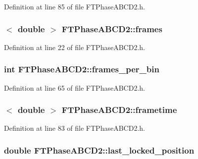 Definition at line 85 of file FTPhaseABCD2.h.

\hypertarget{classFTPhaseABCD2_ac1284b3c87b8a3fcb28fb7aa25021e31}{
\subsubsection[{frames}]{$<$ double $>$ {\bf FTPhaseABCD2::frames}}}
\label{classFTPhaseABCD2_ac1284b3c87b8a3fcb28fb7aa25021e31}


Definition at line 22 of file FTPhaseABCD2.h.

\hypertarget{classFTPhaseABCD2_a819bc8d77a0005500876c87b9b08dab3}{
\subsubsection[{frames\_\-per\_\-bin}]{\setlength{\rightskip}{0pt plus 5cm}int {\bf FTPhaseABCD2::frames\_\-per\_\-bin}}}
\label{classFTPhaseABCD2_a819bc8d77a0005500876c87b9b08dab3}


Definition at line 65 of file FTPhaseABCD2.h.

\hypertarget{classFTPhaseABCD2_a8a835c4c65a6bc45a0032aeced937be6}{
\subsubsection[{frametime}]{$<$ double $>$ {\bf FTPhaseABCD2::frametime}}}
\label{classFTPhaseABCD2_a8a835c4c65a6bc45a0032aeced937be6}


Definition at line 83 of file FTPhaseABCD2.h.

\hypertarget{classFTPhaseABCD2_ac981d1d5990f77f19c3094a871a55697}{
\subsubsection[{last\_\-locked\_\-position}]{\setlength{\rightskip}{0pt plus 5cm}double {\bf FTPhaseABCD2::last\_\-locked\_\-position}}}
\label{classFTPhaseABCD2_ac981d1d5990f77f19c3094a871a55697}


